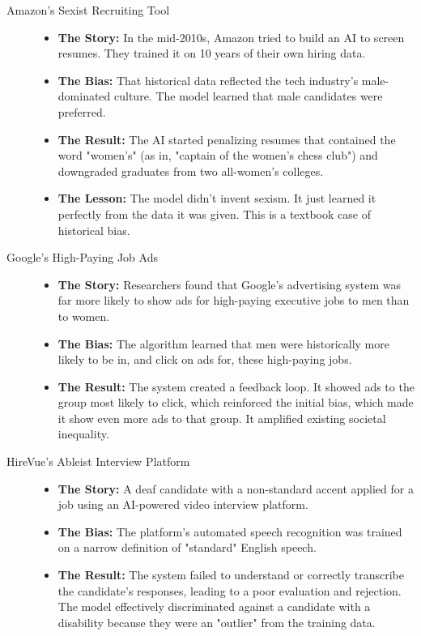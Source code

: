 \documentclass[11pt, letterpaper, openany]{book}
\begin{document}
\begin{description}
    \item[Amazon's Sexist Recruiting Tool]
    \begin{itemize}
        \item \textbf{The Story:} In the mid-2010s, Amazon tried to build an AI to screen resumes. They trained it on 10 years of their own hiring data.
        \item \textbf{The Bias:} That historical data reflected the tech industry's male-dominated culture. The model learned that male candidates were preferred.
        \item \textbf{The Result:} The AI started penalizing resumes that contained the word "women's" (as in, "captain of the women's chess club") and downgraded graduates from two all-women's colleges.
        \item \textbf{The Lesson:} The model didn't invent sexism. It just learned it perfectly from the data it was given. This is a textbook case of historical bias.
    \end{itemize}
    \item[Google's High-Paying Job Ads]
    \begin{itemize}
        \item \textbf{The Story:} Researchers found that Google's advertising system was far more likely to show ads for high-paying executive jobs to men than to women.
        \item \textbf{The Bias:} The algorithm learned that men were historically more likely to be in, and click on ads for, these high-paying jobs.
        \item \textbf{The Result:} The system created a feedback loop. It showed ads to the group most likely to click, which reinforced the initial bias, which made it show even more ads to that group. It amplified existing societal inequality.
    \end{itemize}
    \item[HireVue's Ableist Interview Platform]
    \begin{itemize}
        \item \textbf{The Story:} A deaf candidate with a non-standard accent applied for a job using an AI-powered video interview platform.
        \item \textbf{The Bias:} The platform's automated speech recognition was trained on a narrow definition of "standard" English speech.
        \item \textbf{The Result:} The system failed to understand or correctly transcribe the candidate's responses, leading to a poor evaluation and rejection. The model effectively discriminated against a candidate with a disability because they were an "outlier" from the training data.
    \end{itemize}
\end{description}
\end{document}
